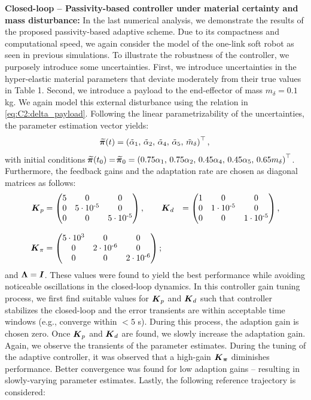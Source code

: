\textbf{Closed-loop -- Passivity-based controller under material certainty and mass disturbance:}
In the last numerical analysis, we demonstrate the results of the proposed passivity-based adaptive scheme. Due to its compactness and computational speed, we again consider the model of the one-link soft robot as seen in previous simulations. To illustrate the robustness of the controller, we purposely introduce some uncertainties. First, we introduce uncertainties in the hyper-elastic material parameters that deviate moderately from their true values in Table 1. Second, we introduce a payload to the end-effector of mass $m_\delta = 0.1$ kg. We again model this external disturbance using the relation in \eqref{eq:C2:delta_payload}. Following the linear parametrizability of the uncertainties, the parameter estimation vector yields:
%
\begin{equation}
\widetilde{\!\boldsymbol{\pi}}(t) = \left( \tilde{\alpha}_1,\,\tilde{\alpha}_2,\,\tilde{\alpha}_4,\, \tilde{\alpha}_5,\, \tilde{m}_\delta\right)^\top,
\end{equation}
%
with initial conditions $\widetilde{\!\boldsymbol{\pi}}(t_0) = \widetilde{\!\boldsymbol{\pi}}_0 = \left(0.75 {\alpha}_1,\,0.75{\alpha}_2,\,0.45{\alpha}_4,\, 0.45{\alpha}_5,\, 0.65{m}_\delta\right)^\top$. Furthermore, the feedback gains and the adaptation rate are chosen as diagonal matrices as follows:
%
\begin{align*}
\boldsymbol{K}_p & = \begin{pmatrix} 
  5 & 0 & 0\\
  0 & 5\cdot10^{\textrm{-5}}& 0 \\ 
  0 & 0 & 5\cdot10^{\textrm{-5}}
\end{pmatrix},  \quad \quad
\boldsymbol{K}_d & = \begin{pmatrix} 
  1 & 0 & 0\\
  0 & 1\cdot10^{\textrm{-5}}& 0 \\ 
  0 & 0 & 1\cdot10^{\textrm{-5}}
\end{pmatrix}, \\[0.75em]
\boldsymbol{K}_\pi & = \begin{pmatrix} 
  5\cdot10^{\textrm{3}} & 0 & 0\\
  0 & 2\cdot10^{\textrm{-6}}& 0 \\ 
  0 & 0 & 2\cdot10^{\textrm{-6}}
\end{pmatrix};
\end{align*}
%
and $\boldsymbol{\Lambda} = \boldsymbol{I}$. These values were found to yield the best performance while avoiding noticeable oscillations in the closed-loop dynamics.  In this controller gain tuning process, we first find suitable values for $\boldsymbol{K}_p$ and $\boldsymbol{K}_d$ such that controller stabilizes the closed-loop and the error transients are within acceptable time windows (e.g., converge within $<5$ s). During this process, the adaption gain is chosen zero. Once $\boldsymbol{K}_p$ and $\boldsymbol{K}_d$ are found, we slowly increase the adaptation gain. Again, we observe the transients of the parameter estimates. During the tuning of the adaptive controller, it was observed that a high-gain $\boldsymbol{K}_{\boldsymbol{\pi}}$ diminishes performance. Better convergence was found for low adaption gains -- resulting in slowly-varying parameter estimates.  Lastly, the following reference trajectory is considered:
